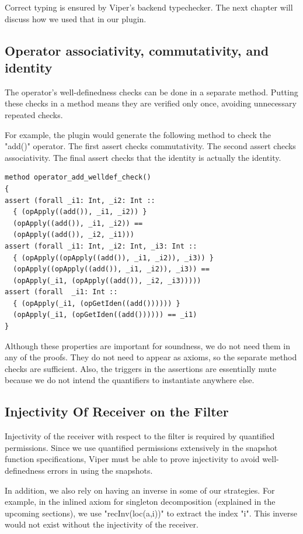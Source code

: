 \documentclass[msc,oneside]{ubcthesis}
\begin{document}
Correct typing is ensured by Viper's backend typechecker. The next chapter will discuss how we used that in our plugin. 

\subsection{Operator associativity, commutativity, and identity}
The operator's well-definedness checks can be done in a 
separate method. Putting these checks in a method means they are verified only once, avoiding unnecessary repeated checks.

For example, the plugin would generate the following method to check the "add()" operator. The first assert checks commutativity. The second assert checks associativity. The final assert checks that the identity is actually the identity. 
\begin{lstlisting}
method operator_add_welldef_check()
{
assert (forall _i1: Int, _i2: Int ::
  { (opApply((add()), _i1, _i2)) }
  (opApply((add()), _i1, _i2)) ==
  (opApply((add()), _i2, _i1)))
assert (forall _i1: Int, _i2: Int, _i3: Int ::
  { (opApply((opApply((add()), _i1, _i2)), _i3)) }
  (opApply((opApply((add()), _i1, _i2)), _i3)) ==
  (opApply(_i1, (opApply((add()), _i2, _i3)))))
assert (forall  _i1: Int ::
  { (opApply(_i1, (opGetIden((add()))))) }
  (opApply(_i1, (opGetIden((add()))))) == _i1)
}
\end{lstlisting}
Although these properties are important for soundness, we do not need them in any of the proofs. They do not need to appear as axioms, so the separate method checks are sufficient. Also, the triggers in the assertions are essentially mute because we do not intend the quantifiers to instantiate anywhere else. 

\subsection{Injectivity Of Receiver on the Filter}
Injectivity of the receiver with respect to the filter is required by quantified permissions. Since we use quantified permissions extensively in the snapshot function specifications, Viper must be able to prove injectivity to avoid well-definedness errors in using the snapshots. 

In addition, we also rely on having an inverse in some of our strategies. For example, in the inlined axiom for singleton decomposition (explained in the upcoming sections), we use "recInv(loc(a,i))" to extract the index "i". This inverse would not exist without the injectivity of the receiver.
\end{document}
